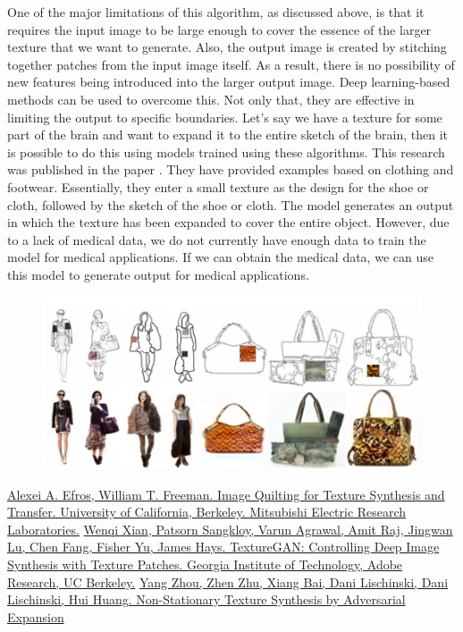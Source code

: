 \documentclass[12pt,a4paper]{report}
\begin{document}
One of the major limitations of this algorithm, as discussed above, is that it requires the input image to be large enough to cover the essence of the larger texture that we want to generate. Also, the output image is created by stitching together patches from the input image itself. As a result, there is no possibility of new features being introduced into the larger output image. Deep learning-based methods can be used to overcome this. Not only that, they are effective in limiting the output to specific boundaries. Let's say we have a texture for some part of the brain and want to expand it to the entire sketch of the brain, then it is possible to do this using models trained using these algorithms. This research was published in the paper \cite[TextureGAN: Controlling Deep Image Synthesis with Texture Patches]{b2}. They have provided examples based on clothing and footwear. Essentially, they enter a small texture as the design for the shoe or cloth, followed by the sketch of the shoe or cloth. The model generates an output in which the texture has been expanded to cover the entire object. However, due to a lack of medical data, we do not currently have enough data to train the model for medical applications. If we can obtain the medical data, we can use this model to generate output for medical applications.

\begin{figure}[H]
  \centering
  \includegraphics[scale = 0.33]{pics/examples.png}
\end{figure}


\begin{thebibliography}{99}
 \href{https://people.eecs.berkeley.edu/~efros/research/quilting/quilting.pdf}{Alexei A. Efros, William T. Freeman. Image Quilting for Texture Synthesis and Transfer. University of California, Berkeley. Mitsubishi Electric Research Laboratories.}
 \href{https://arxiv.org/pdf/1706.02823v3.pdf}{Wenqi Xian, Patsorn Sangkloy, Varun Agrawal, Amit Raj, Jingwan Lu, Chen Fang, Fisher Yu, James Hays. TextureGAN: Controlling Deep Image Synthesis with Texture Patches. Georgia Institute of Technology, Adobe Research, UC Berkeley.}
 \href{https://arxiv.org/pdf/1805.04487v1.pdf}{Yang Zhou, Zhen Zhu, Xiang Bai, Dani Lischinski, Dani Lischinski, Hui Huang. Non-Stationary Texture Synthesis by Adversarial Expansion}
\end{thebibliography}
\end{document}
